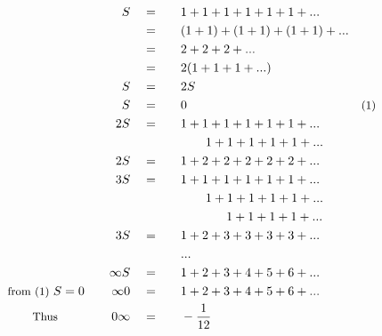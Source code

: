 \begin{alignat*}{5}
&\,&S\quad&=\quad&&1+1+1+1+1+1+...\\
&\,&\,&=&&(1+1)+(1+1)+(1+1)+...\\
&\,&\,&=&&2+2+2+...\\
&\,&\,&=&&2(1+1+1+...)\\
&\,&S\quad&=&&2S\\
&\,&S\quad&=&&0\quad&\small\text{(1)}\\
&\,&2S\quad&=&&1+1+1+1+1+1+...\\
&\,&\,&\,&&\quad~~~1+1+1+1+1+...\\
&\,&2S\quad&=&&1+2+2+2+2+2+...\\
&\,&3S\quad&=&&1+1+1+1+1+1+...\\
&\,&\,&\,&&\quad~~~1+1+1+1+1+...\\
&\,&\,&\,&&\qquad\quad~~1+1+1+1+...\\
&\,&3S\quad&=&&1+2+3+3+3+3+...\\
&\,&\,&\,&&...\\
&\,&\infty S\quad&=\quad&&1+2+3+4+5+6+...\\
&\small\text{from (1) }\normalsize S=0\quad&\infty0\quad&=&&1+2+3+4+5+6+...\\
&\qquad\small\text{Thus}&0\infty\quad&=&&-\frac{1}{12}
\end{alignat*}
